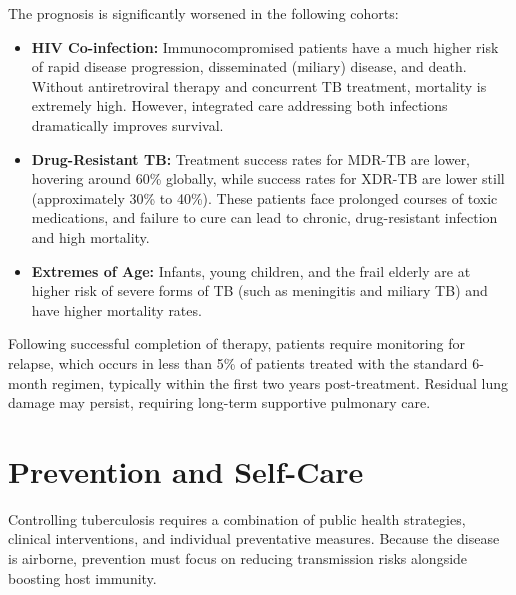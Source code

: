 The prognosis is significantly worsened in the following cohorts:
\begin{itemize}
    \item \textbf{HIV Co-infection:} Immunocompromised patients have a much higher risk of rapid disease progression, disseminated (miliary) disease, and death. Without antiretroviral therapy and concurrent TB treatment, mortality is extremely high. However, integrated care addressing both infections dramatically improves survival.
    \item \textbf{Drug-Resistant TB:} Treatment success rates for MDR-TB are lower, hovering around 60\% globally, while success rates for XDR-TB are lower still (approximately 30\% to 40\%). These patients face prolonged courses of toxic medications, and failure to cure can lead to chronic, drug-resistant infection and high mortality.
    \item \textbf{Extremes of Age:} Infants, young children, and the frail elderly are at higher risk of severe forms of TB (such as meningitis and miliary TB) and have higher mortality rates.
\end{itemize}
Following successful completion of therapy, patients require monitoring for relapse, which occurs in less than 5\% of patients treated with the standard 6-month regimen, typically within the first two years post-treatment. Residual lung damage may persist, requiring long-term supportive pulmonary care.

\section*{Prevention and Self-Care}
Controlling tuberculosis requires a combination of public health strategies, clinical interventions, and individual preventative measures. Because the disease is airborne, prevention must focus on reducing transmission risks alongside boosting host immunity.

